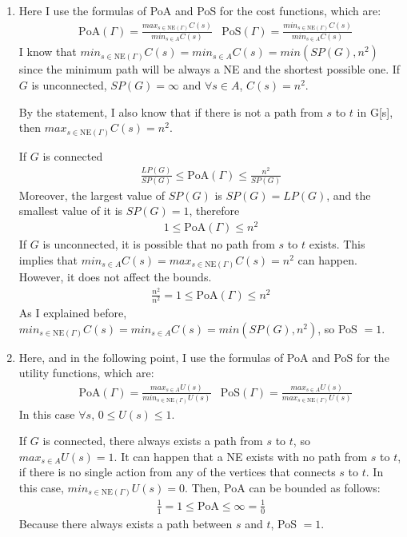 \documentclass[a4paper, 11pt]{article}
\begin{document}
\begin{enumerate}[label=(\alph*)]
    \item Here I use the formulas of PoA and PoS for the cost functions, which are:
        \begin{align}
            &\text{PoA}(\Gamma) = \frac{max_{s \in \text{NE}(\Gamma)} C(s)}{min_{s \in A} C(s)} & \text{PoS}(\Gamma) = \frac{min_{s \in \text{NE}(\Gamma)} C(s)}{min_{s \in A} C(s)}
        \end{align}
        I know that $min_{s \in \text{NE}(\Gamma)} C(s) = min_{s \in A} C(s) = min(SP(G), n^2)$ since the minimum path will be always a NE and the shortest possible one. If $G$ is unconnected, $SP(G) = \infty$ and $\forall s \in A$, $C(s) = n^2$.

        By the statement, I also know that if there is not a path from $s$ to $t$ in G[s], then  $max_{s \in \text{NE}(\Gamma)} C(s) = n^2$.

        If $G$ is connected
        \begin{align}
            \frac{LP(G)}{SP(G)} \leq \text{PoA}(\Gamma) \leq \frac{n^2}{SP(G)}
        \end{align}
        Moreover, the largest value of $SP(G)$ is $SP(G) = LP(G)$, and the smallest value of it is $SP(G) = 1$, therefore
        \begin{align}
            1 \leq \text{PoA}(\Gamma) \leq n^2
        \end{align}
        If $G$ is unconnected, it is possible that no path from $s$ to $t$ exists. This implies that $min_{s \in A} C(s) = max_{s \in \text{NE}(\Gamma)} C(s) = n^2$ can happen. However, it does not affect the bounds.
        \begin{align}
            \frac{n^2}{n^2} = 1 \leq \text{PoA}(\Gamma) \leq n^2
        \end{align}
        As I explained before, $min_{s \in \text{NE}(\Gamma)} C(s) = min_{s \in A} C(s) = min(SP(G), n^2)$, so PoS $= 1$.
    \item Here, and in the following point, I use the formulas of PoA and PoS for the utility functions, which are:
        \begin{align}
            &\text{PoA}(\Gamma) = \frac{max_{s \in A} U(s)}{min_{s \in \text{NE}(\Gamma)} U(s)} & \text{PoS}(\Gamma) = \frac{max_{s \in A} U(s)}{max_{s \in \text{NE}(\Gamma)} U(s)}
        \end{align}
        In this case $\forall s$, $0 \leq U(s) \leq 1$.

        If $G$ is connected, there always exists a path from $s$ to $t$, so $max_{s \in A} U(s) = 1$. It can happen that a NE exists with no path from $s$ to $t$, if there is no single action from any of the vertices that connects $s$ to $t$. In this case, $min_{s \in \text{NE}(\Gamma)} U(s) = 0$. Then, PoA can be bounded as follows:
        \begin{align}
            \frac{1}{1} = 1 \leq \text{PoA} \leq \infty = \frac{1}{0}
        \end{align}
        Because there always exists a path between $s$ and $t$, PoS $= 1$.


\end{enumerate}
\end{document}
